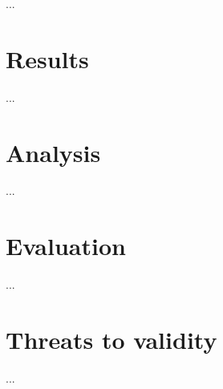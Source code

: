 ...

\section{Results}
...

\section{Analysis}
...

\section{Evaluation}
...

\section{Threats to validity}
...


%
